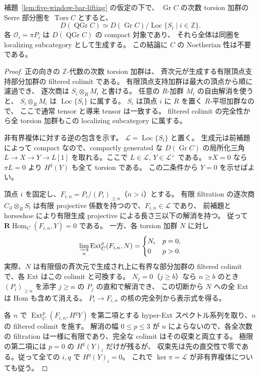 \begin{lemma}
\label{lem:five-window-compact-localization}
補題~\ref{lem:five-window-bar-lifting} の仮定の下で、
$\operatorname{Gr}C$ の次数 torsion 加群の Serre 部分圏を
$\operatorname{Tors}C$ とすると、
\[
 D(\operatorname{QGr}C)\simeq
 D(\operatorname{Gr}C)/\operatorname{Loc}\{S_i\mid i\in\mathbb Z\}.
 \tag{BW-loc}\label{eq:five-window-compact-localization}
\]
各 $\mathcal O_i=\pi P_i$ は $D(\operatorname{QGr}C)$ の compact 対象であり、
それら全体は同圏を localizing subcategory として生成する。
この結論に $C$ の Noetherian 性は不要である。
\end{lemma}
\begin{proof}
正の向きの $\mathbb Z$-代数の次数 torsion 加群は、
斉次元が生成する有限頂点支持部分加群の filtered colimit である。
有限頂点支持加群は最大の頂点から順に濾過でき、
逐次商は $S_i\otimes_R M_i$ と書ける。
任意の $R$-加群 $M_i$ の自由解消を使うと、
$S_i\otimes_RM_i$ は $\operatorname{Loc}\{S_i\}$ に属する。
$S_i$ は頂点 $i$ に $R$ を置く $R$-平坦加群なので、
ここで通常 tensor と導来 tensor は一致する。
filtered colimit の完全性から全 torsion 加群もこの localizing subcategory に属する。

非有界複体に対する逆の包含を示す。
$\mathcal L=\operatorname{Loc}\{S_i\}$ と置く。
生成元は前補題によって compact なので、compactly generated な
$D(\operatorname{Gr}C)$ の局所化三角 $L\to X\to Y\to L[1]$
を取れる。ここで $L\in\mathcal L$, $Y\in\mathcal L^\perp$ である。
$\pi X=0$ なら $\pi L=0$ より $H^q(Y)$ も全て torsion である。
この二条件から $Y=0$ を示せばよい。

頂点 $i$ を固定し、$F_{i,n}=P_i/(P_i)_{\ge n}$（$n>i$）とする。
有限 filtration の逐次商 $C_{il}\otimes_R S_l$ は有限 projective
係数を持つので、$F_{i,n}\in\mathcal L$ であり、
前補題と horseshoe により有限生成 projective による長さ三以下の解消を持つ。
従って $\mathbf R\operatorname{Hom}_C(F_{i,n},Y)=0$ である。
一方、各 torsion 加群 $N$ に対し
\[
 \varinjlim_n\operatorname{Ext}^p_C(F_{i,n},N)=
 \begin{cases} N_i & p=0,\\0&p>0.\end{cases}
\]
実際、$N$ は有限個の斉次元で生成され上に有界な部分加群の
filtered colimit で、各 Ext はこの colimit と可換する。
$N_j=0$（$j\ge b$）なら $n\ge b$ のとき
$(P_i)_{\ge n}$ を添字 $j\ge n$ の $P_j$ の直和で解消でき、
この切断から $N$ への全 Ext は Hom も含めて消える。
$P_i\to F_{i,n}$ の核の完全列から表示式を得る。

各 $n$ で $\operatorname{Ext}^p_C(F_{i,n},H^qY)$ を第二項とする
hyper-Ext スペクトル系列を取り、$n$ の filtered colimit を施す。
解消の幅 $0\le p\le3$ が $n$ によらないので、各全次数の filtration
は一様に有限であり、完全な colimit はその収束と両立する。
極限の第二項には $p=0$ の $H^q(Y)_i$ だけが残るが、
収束先は先の直交性で零である。従って全ての $i,q$ で $H^q(Y)_i=0$。
これで $\ker\pi=\mathcal L$ が非有界複体についても従う。


\end{proof}
